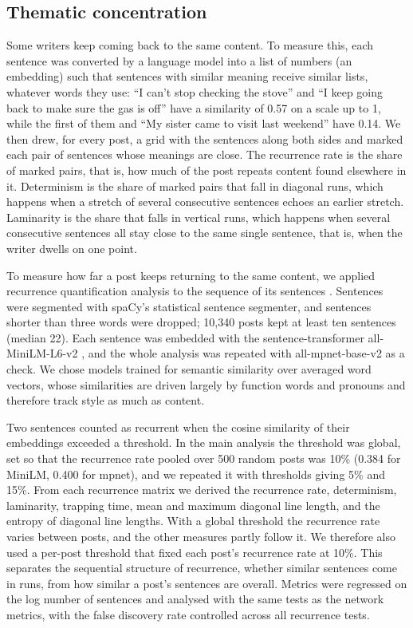 \documentclass[11pt,a4paper]{article}
\begin{document}
\subsection{Thematic concentration}\label{sec:rqa}

Some writers keep coming back to the same content. To measure this, each sentence was converted by a language model into a list of numbers (an embedding) such that sentences with similar meaning receive similar lists, whatever words they use: ``I can't stop checking the stove'' and ``I keep going back to make sure the gas is off'' have a similarity of 0.57 on a scale up to 1, while the first of them and ``My sister came to visit last weekend'' have 0.14. We then drew, for every post, a grid with the sentences along both sides and marked each pair of sentences whose meanings are close. The recurrence rate is the share of marked pairs, that is, how much of the post repeats content found elsewhere in it. Determinism is the share of marked pairs that fall in diagonal runs, which happens when a stretch of several consecutive sentences echoes an earlier stretch. Laminarity is the share that falls in vertical runs, which happens when several consecutive sentences all stay close to the same single sentence, that is, when the writer dwells on one point.

To measure how far a post keeps returning to the same content, we applied recurrence quantification analysis to the sequence of its sentences \citep{marwan2007}. Sentences were segmented with spaCy's statistical sentence segmenter, and sentences shorter than three words were dropped; 10,340 posts kept at least ten sentences (median 22). Each sentence was embedded with the sentence-transformer all-MiniLM-L6-v2 \citep{reimers2019}, and the whole analysis was repeated with all-mpnet-base-v2 as a check. We chose models trained for semantic similarity over averaged word vectors, whose similarities are driven largely by function words and pronouns and therefore track style as much as content.

Two sentences counted as recurrent when the cosine similarity of their embeddings exceeded a threshold. In the main analysis the threshold was global, set so that the recurrence rate pooled over 500 random posts was 10\% (0.384 for MiniLM, 0.400 for mpnet), and we repeated it with thresholds giving 5\% and 15\%. From each recurrence matrix we derived the recurrence rate, determinism, laminarity, trapping time, mean and maximum diagonal line length, and the entropy of diagonal line lengths. With a global threshold the recurrence rate varies between posts, and the other measures partly follow it. We therefore also used a per-post threshold that fixed each post's recurrence rate at 10\%. This separates the sequential structure of recurrence, whether similar sentences come in runs, from how similar a post's sentences are overall. Metrics were regressed on the log number of sentences and analysed with the same tests as the network metrics, with the false discovery rate controlled across all recurrence tests.
\end{document}
